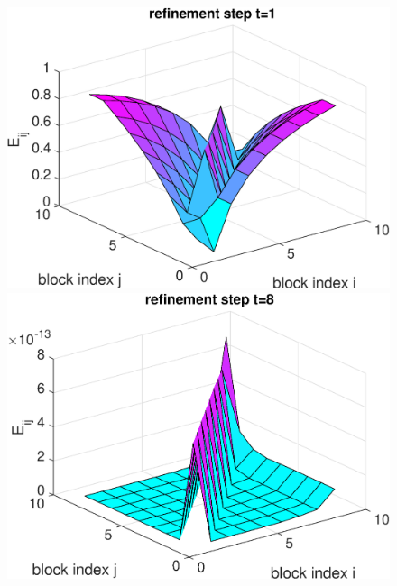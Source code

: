 \begin{example}
{\begin{figure}[h!]
\begin{minipage}[t]{0.48\linewidth}
\includegraphics[width=0.99\linewidth]{figures/9times9_Z1_Error_t1.eps}
\end{minipage}
%
\begin{minipage}[t]{0.48\linewidth}
\includegraphics[width=0.99\linewidth]{figures/9times9_Z1_Error_t8.eps}
\end{minipage}
\\\vspace*{0.8em}
\begin{minipage}[t]{0.48\linewidth}
\centering

\end{minipage}
\end{figure}}
\end{example}
